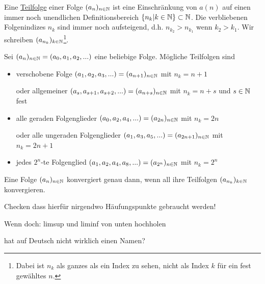 \begin{definition}[Teilfolge]
    Eine \underline{Teilfolge} einer Folge $(a_n)_{n \in \mathbb{N}}$ ist eine Einschränkung von $a(n)$ auf einen immer noch unendlichen Definitionsbereich $\{n_k | k \in \mathbb{N}\} \subset \mathbb{N}$. Die verbliebenen Folgenindizes $n_k$ sind immer noch aufsteigend, d.h. $n_{k_2} > n_{k_1}$ wenn $k_2 > k_1$. Wir schreiben $(a_{n_k})_{k \in \mathbb{N}}$\footnote{Dabei ist $n_k$ als ganzes als ein Index zu sehen, nicht als Index $k$ für ein fest gewähltes $n$.}.
\end{definition}

\begin{example}
    Sei $(a_n)_{n \in \mathbb{N}} = (a_0, a_1, a_2, ...)$ eine beliebige Folge. Mögliche Teilfolgen sind
    \begin{itemize}
        \item verschobene Folge $(a_1, a_2, a_3, ...) = (a_{n+1})_{n \in \mathbb{N}}$ mit $n_k = n+1$
        
        oder allgemeiner $(a_s, a_{s+1}, a_{s+2}, ...) = (a_{n+s})_{n \in \mathbb{N}}$ mit $n_k = n+s$ und $s \in \mathbb{N}$ fest
        \item alle geraden Folgenglieder $(a_0, a_2, a_4, ...) = (a_{2n})_{n \in \mathbb{N}}$ mit $n_k = 2n$
        
        oder alle ungeraden Folgenglieder $(a_1, a_3, a_5, ...) = (a_{2n+1})_{n \in \mathbb{N}}$ mit $n_k = 2n+1$
        \item jedes $2^n$-te Folgenglied $(a_1, a_2, a_4, a_8, ...) = (a_{2^n})_{n \in \mathbb{N}}$ mit $n_k = 2^n$
    \end{itemize}
\end{example}

\begin{lemma}[lemma]
    Eine Folge $(a_n)_{n \in \mathbb{N}}$ konvergiert genau dann, wenn all ihre Teilfolgen $(a_{n_k})_{k \in \mathbb{N}}$ konvergieren.
\end{lemma}

\begin{query}
    Checken dass hierfür nirgendwo Häufungspunkte gebraucht werden!

    Wenn doch: limsup und liminf von unten hochholen
\end{query}

\begin{definition}
    hat auf Deutsch nicht wirklich einen Namen?
\end{definition}

